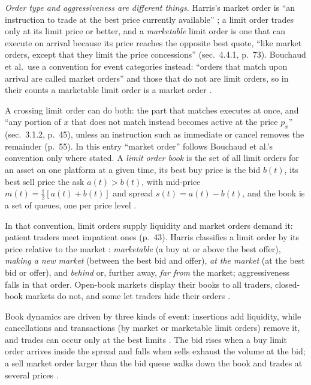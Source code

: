\begin{qfdefinition}\label{def:limit-order-book}
 \emph{Order type and aggressiveness are different things.} Harris's market order is ``an instruction to trade at the best price currently available'' \citep[chap.~4, sec.~4.3, p.~71]{alpha-harris}; a limit order trades only at its limit price or better, and a \emph{marketable} limit order is one that can execute on arrival because its price reaches the opposite best quote, ``like market orders, except that they limit the price concessions'' (sec.~4.4.1, p.~73). Bouchaud et al.\ use a convention for event categories instead: ``orders that match upon arrival are called market orders'' and those that do not are limit orders, so in their counts a marketable limit order is a market order \citep[chap.~3, sec.~3.1.3, p.~45]{catalogue-0528}.

A crossing limit order can do both: the part that matches executes at once, and ``any portion of $x$ that does not match instead becomes active at the price $p_x$'' (sec.~3.1.2, p.~45), unless an instruction such as immediate or cancel removes the remainder (p.~55). In this entry ``market order'' follows Bouchaud et al.'s convention only where stated. A \emph{limit order book} is the set of all limit orders for an asset on one platform at a given time, its best buy price is the bid $b(t)$, its best sell price the ask $a(t)>b(t)$, with mid-price $m(t)=\tfrac12[a(t)+b(t)]$ and spread $s(t)=a(t)-b(t)$, and the book is a set of queues, one per price level \citep[chap.~3, secs.~3.1.3--3.1.4, pp.~45--47]{catalogue-0528}.

In that convention, limit orders supply liquidity and market orders demand it: patient traders meet impatient ones (p.~43). Harris classifies a limit order by its price relative to the market \citep[chap.~4, sec.~4.4.1, Table~4-1, pp.~73--74]{alpha-harris}: \emph{marketable} (a buy at or above the best offer), \emph{making a new market} (between the best bid and offer), \emph{at the market} (at the best bid or offer), and \emph{behind} or, further away, \emph{far from} the market; aggressiveness falls in that order. Open-book markets display their books to all traders, closed-book markets do not, and some let traders hide their orders \citep[chap.~5, p.~109]{alpha-harris}.

 Book dynamics are driven by three kinds of event: insertions add liquidity, while cancellations and transactions (by market or marketable limit orders) remove it, and trades can occur only at the best limits \citep[chap.~3, sec.~3.3.1, p.~219]{alpha-laruelle}. The bid rises when a buy limit order arrives inside the spread and falls when sells exhaust the volume at the bid; a sell market order larger than the bid queue walks down the book and trades at several prices \citep[chap.~3, sec.~3.1.8, p.~51; Table~3.1, p.~53]{catalogue-0528}.


\end{qfdefinition}
